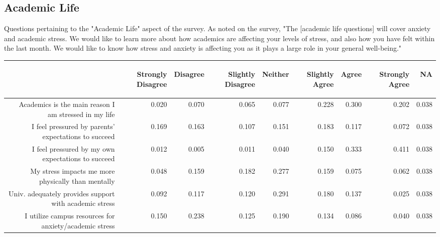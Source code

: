 \documentclass{article}\usepackage[]{graphicx}\usepackage[]{color}
\begin{document}
\subsection{Academic Life}
Questions pertaining to the "Academic Life" aspect of the survey. As noted on the survey, "The [academic life questions] will cover anxiety and academic stress.  We would like to learn more about how academics are affecting your levels of stress, and also how you have felt within the last month.  We would like to know how stress and anxiety is affecting you as it plays a large role in your general well-being."
\begin{table}[ht]
\centering
\begin{tabular}{rrrrrrrrr}
  \hline
 & \begin{sideways} Strongly Disagree \end{sideways} & \begin{sideways} Disagree \end{sideways} & \begin{sideways} Slightly Disagree \end{sideways} & \begin{sideways} Neither \end{sideways} & \begin{sideways} Slightly Agree \end{sideways} & \begin{sideways} Agree \end{sideways} & \begin{sideways} Strongly Agree \end{sideways} & \begin{sideways} NA \end{sideways} \\ 
  \hline
Academics is the main reason I am stressed in my life & 0.020 & 0.070 & 0.065 & 0.077 & 0.228 & 0.300 & 0.202 & 0.038 \\ 
  I feel pressured by parents' expectations to succeed & 0.169 & 0.163 & 0.107 & 0.151 & 0.183 & 0.117 & 0.072 & 0.038 \\ 
  I feel pressured by my own expectations to succeed & 0.012 & 0.005 & 0.011 & 0.040 & 0.150 & 0.333 & 0.411 & 0.038 \\ 
  My stress impacts me more physically than mentally & 0.048 & 0.159 & 0.182 & 0.277 & 0.159 & 0.075 & 0.062 & 0.038 \\ 
  Univ. adequately provides support with academic stress & 0.092 & 0.117 & 0.120 & 0.291 & 0.180 & 0.137 & 0.025 & 0.038 \\ 
  I utilize campus resources for anxiety/academic stress & 0.150 & 0.238 & 0.125 & 0.190 & 0.134 & 0.086 & 0.040 & 0.038 \\ 
   \hline
\end{tabular}
\end{table}
\end{document}
